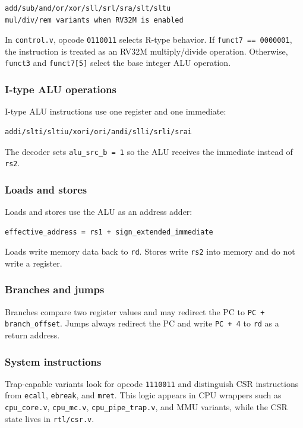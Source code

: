 \begin{lstlisting}[language={}]
add/sub/and/or/xor/sll/srl/sra/slt/sltu
mul/div/rem variants when RV32M is enabled
\end{lstlisting}

In \texttt{control.v}, opcode \texttt{0110011} selects R-type behavior. If \texttt{funct7 == 0000001}, the instruction is treated as an RV32M multiply/divide operation. Otherwise, \texttt{funct3} and \texttt{funct7[5]} select the base integer ALU operation.

\subsubsection{I-type ALU operations}

I-type ALU instructions use one register and one immediate:

\begin{lstlisting}[language={}]
addi/slti/sltiu/xori/ori/andi/slli/srli/srai
\end{lstlisting}

The decoder sets \texttt{alu\_src\_b = 1} so the ALU receives the immediate instead of \texttt{rs2}.

\subsubsection{Loads and stores}

Loads and stores use the ALU as an address adder:

\begin{lstlisting}[language={}]
effective_address = rs1 + sign_extended_immediate
\end{lstlisting}

Loads write memory data back to \texttt{rd}. Stores write \texttt{rs2} into memory and do not write a register.

\subsubsection{Branches and jumps}

Branches compare two register values and may redirect the PC to \texttt{PC + branch\_offset}. Jumps always redirect the PC and write \texttt{PC + 4} to \texttt{rd} as a return address.

\subsubsection{System instructions}

Trap-capable variants look for opcode \texttt{1110011} and distinguish CSR instructions from \texttt{ecall}, \texttt{ebreak}, and \texttt{mret}. This logic appears in CPU wrappers such as \texttt{cpu\_core.v}, \texttt{cpu\_mc.v}, \texttt{cpu\_pipe\_trap.v}, and MMU variants, while the CSR state lives in \texttt{rtl/csr.v}.

\bigskip
